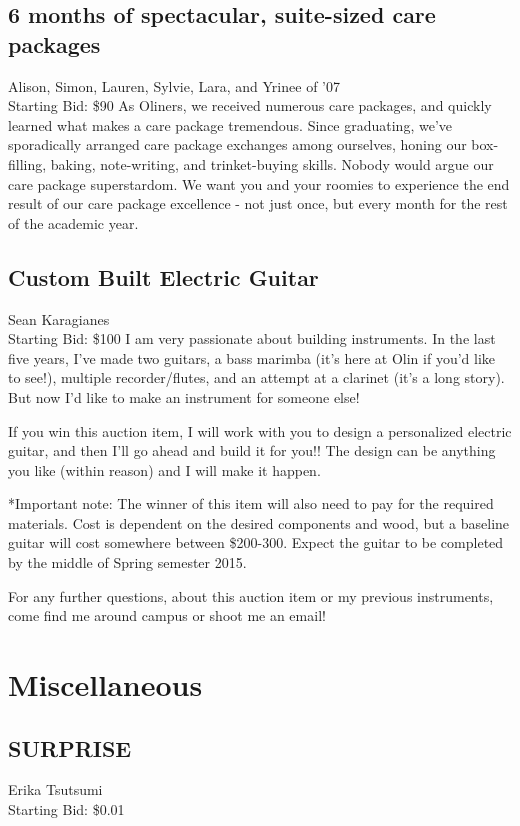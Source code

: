 \documentclass[11pt]{article}
\begin{document}
\subsection{6 months of spectacular, suite-sized care packages}
Alison, Simon, Lauren, Sylvie, Lara, and Yrinee of '07
\\
Starting Bid: \$90
\newline
As Oliners, we received numerous care packages, and quickly learned what makes a care package tremendous. Since graduating, we've sporadically arranged care package exchanges among ourselves, honing our box-filling, baking, note-writing, and trinket-buying skills. Nobody would argue our care package superstardom. We want you and your roomies to experience the end result of our care package excellence - not just once, but every month for the rest of the academic year.
\subsection{Custom Built Electric Guitar}
Sean Karagianes
\\
Starting Bid: \$100
\newline
I am very passionate about building instruments. In the last five years, I've made two guitars, a bass marimba (it's here at Olin if you'd like to see!), multiple recorder/flutes, and an attempt at a clarinet (it's a long story). But now I'd like to make an instrument for someone else!

If you win this auction item, I will work with you to design a personalized electric guitar, and then I'll go ahead and build it for you!! The design can be anything you like (within reason) and I will make it happen. 

*Important note: The winner of this item will also need to pay for the required materials. Cost is dependent on the desired components and wood, but a baseline guitar will cost somewhere between \$200-300. Expect the guitar to be completed by the middle of Spring semester 2015.

For any further questions, about this auction item or my previous instruments, come find me around campus or shoot me an email!
\section{Miscellaneous}
\subsection{SURPRISE}
Erika Tsutsumi
\\
Starting Bid: \$0.01
\newline
\end{document}
